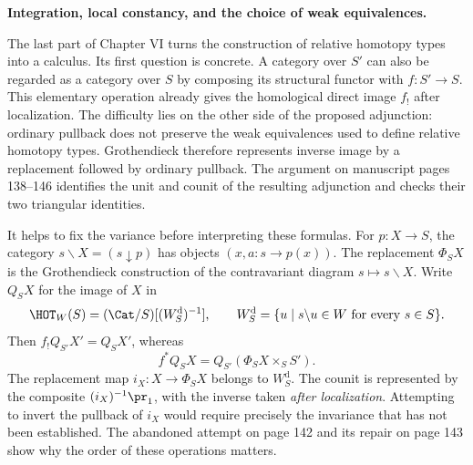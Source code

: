 \nocite{GrothendieckDerivateursVI}
\noindent\textbf{Integration, local constancy, and the choice of weak equivalences.}

The last part of Chapter VI turns the construction of relative homotopy types into a calculus. Its first question is concrete. A category over $S'$ can also be regarded as a category over $S$ by composing its structural functor with $f:S'\to S$. This elementary operation already gives the homological direct image $f_!$ after localization. The difficulty lies on the other side of the proposed adjunction: ordinary pullback does not preserve the weak equivalences used to define relative homotopy types. Grothendieck therefore represents inverse image by a replacement followed by ordinary pullback. The argument on manuscript pages 138--146 identifies the unit and counit of the resulting adjunction and checks their two triangular identities.

It helps to fix the variance before interpreting these formulas. For $p:X\to S$, the category $s\backslash X=(s\downarrow p)$ has objects $(x,a:s\to p(x))$. The replacement $\Phi_SX$ is the Grothendieck construction of the contravariant diagram $s\mapsto s\backslash X$. Write $Q_SX$ for the image of $X$ in
\[
 \HOT_W(S)=(\Cat/S)[(W_S^{\mathrm d})^{-1}],\qquad
 W_S^{\mathrm d}=\{u\mid s\backslash u\in W\text{ for every }s\in S\}.
\]
Then $f_!Q_{S'}X'=Q_SX'$, whereas
\[
 f^*Q_SX=Q_{S'}(\Phi_SX\times_SS').
\]
The replacement map $i_X:X\to\Phi_SX$ belongs to $W_S^{\mathrm d}$. The counit is represented by the composite $(i_X)^{-1}\pr_1$, with the inverse taken \emph{after localization}. Attempting to invert the pullback of $i_X$ would require precisely the invariance that has not been established. The abandoned attempt on page 142 and its repair on page 143 show why the order of these operations matters.

